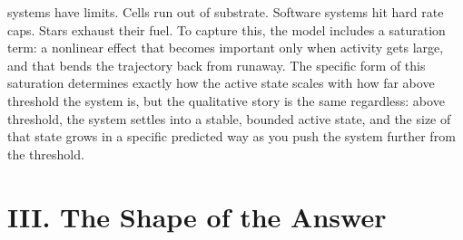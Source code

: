 \documentclass[12pt]{article}
\begin{document}
systems have limits. Cells run out of substrate. Software systems hit hard rate caps. Stars exhaust their fuel. To capture this, the model includes a saturation term: a nonlinear effect that becomes important only when activity gets large, and that bends the trajectory back from runaway. The specific form of this saturation determines exactly how the active state scales with how far above threshold the system is, but the qualitative story is the same regardless: above threshold, the system settles into a stable, bounded active state, and the size of that state grows in a specific predicted way as you push the system further from the threshold.


\section*{III. The Shape of the Answer}
\end{document}
